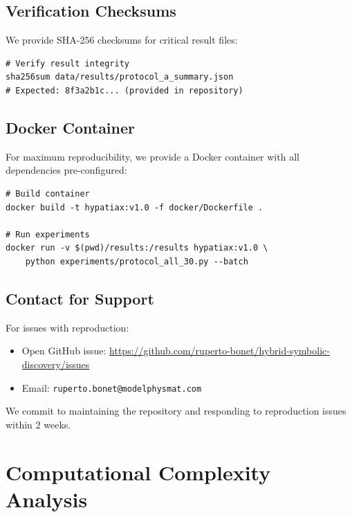 \documentclass[twoside,11pt]{article}
\begin{document}
\subsection{Verification Checksums}

We provide SHA-256 checksums for critical result files:

\begin{small}
\begin{verbatim}
# Verify result integrity
sha256sum data/results/protocol_a_summary.json
# Expected: 8f3a2b1c... (provided in repository)
\end{verbatim}
\end{small}

\subsection{Docker Container}

For maximum reproducibility, we provide a Docker container with all dependencies pre-configured:

\begin{small}
\begin{verbatim}
# Build container
docker build -t hypatiax:v1.0 -f docker/Dockerfile .

# Run experiments
docker run -v $(pwd)/results:/results hypatiax:v1.0 \
    python experiments/protocol_all_30.py --batch
\end{verbatim}
\end{small}

\subsection{Contact for Support}

For issues with reproduction:
\begin{itemize}
\item Open GitHub issue: \url{https://github.com/ruperto-bonet/hybrid-symbolic-discovery/issues}
\item Email: \texttt{ruperto.bonet@modelphysmat.com}
\end{itemize}

We commit to maintaining the repository and responding to reproduction issues within 2 weeks.


\section{Computational Complexity Analysis}
\label{app:complexity}
\end{document}
